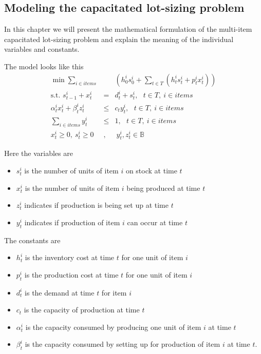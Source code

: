 \subsection{Modeling the capacitated lot-sizing problem}
\label{sec:modelling_clsp}

In this chapter we will present the mathematical formulation of the multi-item
capacitated lot-sizing problem and explain the meaning of the individual variables and constants.

The model looks like this
{\setlength\arraycolsep{2pt}
\begin{eqnarray}\label{clsp_definition}
\min  \sum_{i\in items}^{}&& \left( h_0^i s_0^i + \sum_{t\in T} (
h_t^i s_t^i + p_t^i x_t^i) \right) \\
\textrm{s.t. } s_{t-1}^i + x_{t}^i &=& d_t^i + s_{t}^i, \textrm{ }t
\in T,\ i \in items \\
\alpha_t^i x_t^i + \beta_t^i z_t^i &\leq& c_t y_t^i, \textrm{ }t \in
T, \ i \in items\\
\sum_{i \in items} y_t^i &\leq& 1,\textrm{ }t \in T, \ i \in items\\
x_t^i \geq 0,\ s_t^i \geq 0&,&\ y_t^i, z_t^i \in \mathbb{B}
\end{eqnarray}}

Here the variables are
\begin{itemize}
\item $s_t^i$ is the number of units of item $i$ on stock at time $t$
\item $x_t^i$ is the number of units of item $i$ being produced at time $t$
\item $z_t^i$ indicates if production is being set up at time $t$
\item $y_t^i$ indicates if production of item $i$ can occur at time $t$
\end{itemize}

The constants are
\begin{itemize}
\item $h_t^i$ is the inventory cost at time $t$ for one unit of item $i$
\item $p_t^i$ is the production cost at time $t$ for one unit of item $i$
\item $d_t^i$ is the demand at time $t$ for item $i$
\item $c_t$ is the capacity of production at time $t$
\item $\alpha_t^i$ is the capacity consumed by producing one unit of
  item $i$ at time $t$
\item $\beta_t^i$ is the capacity consumed by setting up for
  production of item $i$ at time $t$.
\end{itemize}


